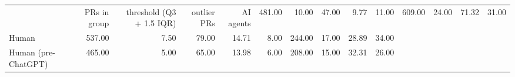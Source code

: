 \begin{tabular}{lrrrrrrrrr}
\toprule
 & PRs in group & threshold (Q3 + 1.5 IQR) & outlier PRs & %
\midrule
AI agents & 481.00 & 10.00 & 47.00 & 9.77 & 11.00 & 609.00 & 24.00 & 71.32 & 31.00 \\
Human & 537.00 & 7.50 & 79.00 & 14.71 & 8.00 & 244.00 & 17.00 & 28.89 & 34.00 \\
Human (pre-ChatGPT) & 465.00 & 5.00 & 65.00 & 13.98 & 6.00 & 208.00 & 15.00 & 32.31 & 26.00 \\
\bottomrule
\end{tabular}

